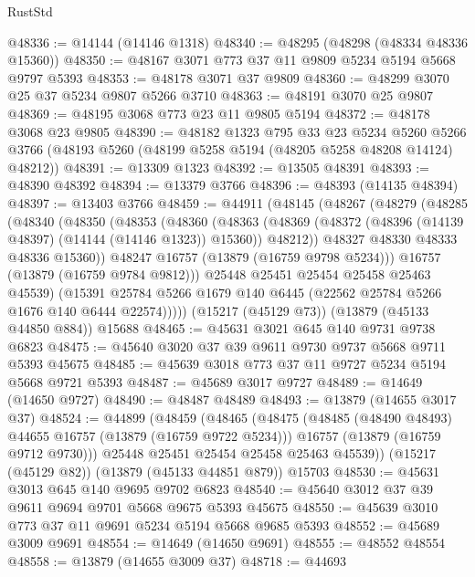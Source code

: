 \begin{lexlean}{RustStd}
\begin{coremodule}
@48336 := @14144 (@14146 @1318)
@48340 := @48295 (@48298 (@48334 @48336 @15360))
@48350 := @48167 @3071 @773 @37 @11 @9809 @5234 @5194 @5668 @9797 @5393
@48353 := @48178 @3071 @37 @9809
@48360 := @48299 @3070 @25 @37 @5234 @9807 @5266 @3710
@48363 := @48191 @3070 @25 @9807
@48369 := @48195 @3068 @773 @23 @11 @9805 @5194
@48372 := @48178 @3068 @23 @9805
@48390 := @48182
    @1323
    @795
    @33
    @23
    @5234
    @5260
    @5266
    @3766
    (@48193 @5260 (@48199 @5258 @5194 (@48205 @5258 @48208 @14124) @48212))
@48391 := @13309 @1323
@48392 := @13505 @48391
@48393 := @48390 @48392
@48394 := @13379 @3766
@48396 := @48393 (@14135 @48394)
@48397 := @13403 @3766
@48459 := @44911
    (@48145
      (@48267
        (@48279
          (@48285
            (@48340
              (@48350
                (@48353
                  (@48360
                    (@48363
                      (@48369
                        (@48372 (@48396 (@14139 @48397) (@14144 (@14146 @1323)) @15360))
                        @48212))
                    @48327
                    @48330
                    @48333
                    @48336
                    @15360))
                @48247
                @16757
                (@13879 (@16759 @9798 @5234)))
              @16757
              (@13879 (@16759 @9784 @9812)))
            @25448
            @25451
            @25454
            @25458
            @25463
            @45539)
          (@15391 @25784 @5266 @1679 @140 @6445 (@22562 @25784 @5266 @1676 @140 @6444 @22574)))))
    (@15217 (@45129 @73))
    (@13879 (@45133 @44850 @884))
    @15688
@48465 := @45631 @3021 @645 @140 @9731 @9738 @6823
@48475 := @45640 @3020 @37 @39 @9611 @9730 @9737 @5668 @9711 @5393 @45675
@48485 := @45639 @3018 @773 @37 @11 @9727 @5234 @5194 @5668 @9721 @5393
@48487 := @45689 @3017 @9727
@48489 := @14649 (@14650 @9727)
@48490 := @48487 @48489
@48493 := @13879 (@14655 @3017 @37)
@48524 := @44899
    (@48459
      (@48465
        (@48475
          (@48485 (@48490 @48493) @44655 @16757 (@13879 (@16759 @9722 @5234)))
          @16757
          (@13879 (@16759 @9712 @9730)))
        @25448
        @25451
        @25454
        @25458
        @25463
        @45539))
    (@15217 (@45129 @82))
    (@13879 (@45133 @44851 @879))
    @15703
@48530 := @45631 @3013 @645 @140 @9695 @9702 @6823
@48540 := @45640 @3012 @37 @39 @9611 @9694 @9701 @5668 @9675 @5393 @45675
@48550 := @45639 @3010 @773 @37 @11 @9691 @5234 @5194 @5668 @9685 @5393
@48552 := @45689 @3009 @9691
@48554 := @14649 (@14650 @9691)
@48555 := @48552 @48554
@48558 := @13879 (@14655 @3009 @37)
@48718 := @44693

\end{coremodule}
\end{lexlean}
